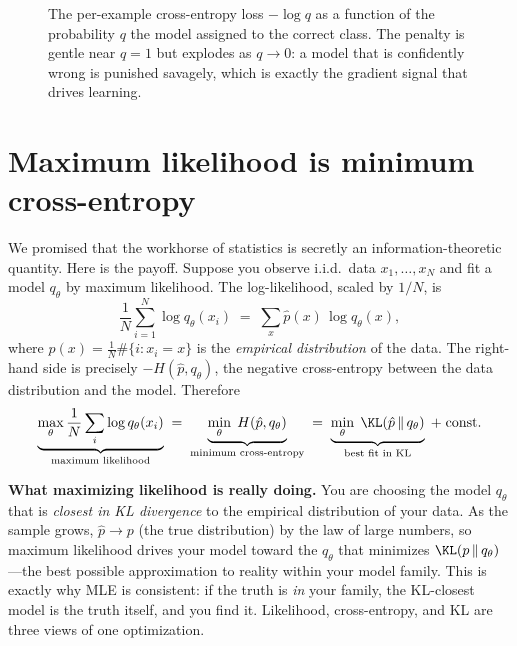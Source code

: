 \begin{figure}[H]
\centering
{}
\caption{The per-example cross-entropy loss $-\log q$ as a function of the probability $q$ the model
assigned to the correct class. The penalty is gentle near $q=1$ but explodes as $q \to 0$: a model that is
confidently wrong is punished savagely, which is exactly the gradient signal that drives learning.}
\label{ch33:fig-crossentropy-loss}
\end{figure}

\section{Maximum likelihood is minimum cross-entropy}
\label{ch33:mle-connection}

We promised that the workhorse of statistics is secretly an information-theoretic quantity. Here is the
payoff. Suppose you observe i.i.d.\ data $x_1, \dots, x_N$ and fit a model $q_\theta$ by maximum
likelihood. The log-likelihood, scaled by $1/N$, is
\[
  \frac{1}{N}\sum_{i=1}^N \log q_\theta(x_i)
  \;=\; \sum_{x} \hat p(x)\,\log q_\theta(x),
\]
where $\hat p(x) = \frac1N \#\{i : x_i = x\}$ is the \emph{empirical distribution} of the data. The
right-hand side is precisely $-H(\hat p, q_\theta)$, the negative cross-entropy between the data
distribution and the model. Therefore
\[
  \underbrace{\max_\theta \frac1N \sum_i \log q_\theta(x_i)}_{\text{maximum likelihood}}
  \;=\;
  \underbrace{\min_\theta\; H(\hat p, q_\theta)}_{\text{minimum cross-entropy}}
  \;=\;
  \underbrace{\min_\theta\; \KL(\hat p \,\|\, q_\theta)}_{\text{best fit in KL}}
  \;+\; \text{const}.
\]

\begin{happeningbox}
\textbf{What maximizing likelihood is really doing.} You are choosing the model $q_\theta$ that
is \emph{closest in KL divergence} to the empirical distribution of your data. As the sample grows,
$\hat p \to p$ (the true distribution) by the law of large numbers, so maximum likelihood drives your
model toward the $q_\theta$ that minimizes $\KL(p\,\|\,q_\theta)$---the best possible approximation to
reality within your model family. This is exactly why MLE is consistent: if the truth is \emph{in} your
family, the KL-closest model is the truth itself, and you find it. Likelihood, cross-entropy, and KL are
three views of one optimization.
\end{happeningbox}

